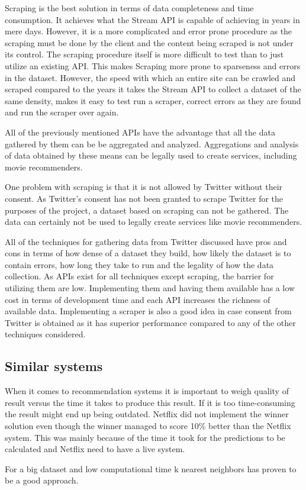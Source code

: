 Scraping is the best solution in terms of data completeness and time consumption. It achieves what the Stream API is capable of achieving in years in mere days. However, it is a more complicated and error prone procedure as the scraping must be done by the client and the content being scraped is not under its control. The scraping procedure itself is more difficult to test than to just utilize an existing API. This makes Scraping more prone to sparseness and errors in the dataset. However, the speed with which an entire site can be crawled and scraped compared to the years it takes the Stream API to collect a dataset of the same density, makes it easy to test run a scraper, correct errors as they are found and run the scraper over again.

All of the previously mentioned APIs have the advantage that all the data gathered by them can be be aggregated and analyzed. Aggregations and analysis of data obtained by these means can be legally used to create services, including movie recommenders.

One problem with scraping is that it is not allowed by Twitter without their consent. As Twitter's consent has not been granted to scrape Twitter for the purposes of the project, a dataset based on scraping can not be gathered. The data can certainly not be used to legally create services like movie recommenders.

All of the techniques for gathering data from Twitter discussed have pros and cons in terms of how dense of a dataset they build, how likely the dataset is to contain errors, how long they take to run and the legality of how the data collection. As APIs exist for all techniques except scraping, the barrier for utilizing them are low. Implementing them and having them available has a low cost in terms of development time and each API increases the richness of available data. Implementing a scraper is also a good idea in case consent from Twitter is obtained as it has superior performance compared to any of the other techniques considered.

\subsection{Similar systems}
When it comes to recommendation systems it is important to weigh quality of result versus the time it takes to produce this result. If it is too time-consuming the result might end up being outdated. Netflix did not implement the winner solution even though the winner managed to score 10\% better than the Netflix system. This was mainly because of the time it took for the predictions to be calculated and Netflix need to have a live system.

For a big dataset and low computational time k nearest neighbors has proven to be a good approach.
